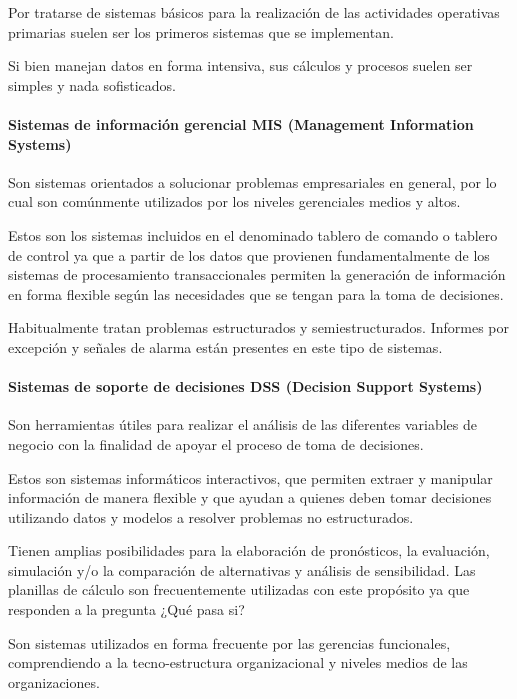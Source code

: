 \documentclass[a4paper, 12pt]{article}
\begin{document}
Por tratarse de sistemas básicos para la realización de las actividades operativas primarias suelen ser los primeros sistemas que se implementan. 

Si bien manejan datos en forma intensiva, sus cálculos y procesos suelen ser simples y nada sofisticados. 

\paragraph{Sistemas de información gerencial MIS (Management Information Systems)}

Son sistemas orientados a solucionar problemas empresariales en general, por lo cual son comúnmente utilizados por los niveles gerenciales medios y altos.

Estos son los sistemas incluidos en el denominado tablero de comando o tablero de control ya que a partir de los datos que provienen fundamentalmente de los sistemas de procesamiento transaccionales permiten la generación de información en forma flexible según las necesidades que se tengan para la toma de decisiones.

Habitualmente tratan problemas estructurados y semiestructurados. Informes por excepción y señales de alarma están presentes en este tipo de sistemas.

\paragraph{Sistemas de soporte de decisiones DSS (Decision Support Systems)}

Son herramientas útiles para realizar el análisis de las diferentes variables de negocio con la finalidad de apoyar el proceso de toma de decisiones.

Estos son sistemas informáticos interactivos, que permiten extraer y manipular información de manera flexible y que ayudan a quienes deben tomar decisiones utilizando datos y modelos a resolver problemas no estructurados.

Tienen amplias posibilidades para la elaboración de pronósticos, la evaluación, simulación y/o la comparación de alternativas y análisis de sensibilidad. Las planillas de cálculo son frecuentemente utilizadas con este propósito ya que responden a la pregunta ¿Qué pasa si? 

Son sistemas utilizados en forma frecuente por las gerencias funcionales, comprendiendo a la tecno-estructura organizacional y niveles medios de las organizaciones.
\end{document}

